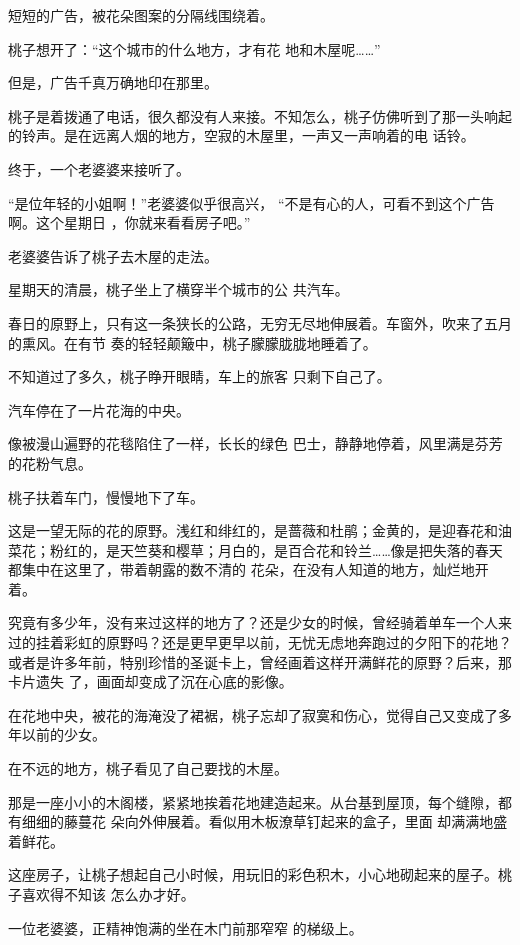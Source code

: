 \documentclass{article}
\begin{document}
短短的广告，被花朵图案的分隔线围绕着。 

桃子想开了：“这个城市的什么地方，才有花
地和木屋呢……” 


但是，广告千真万确地印在那里。 

桃子是着拨通了电话，很久都没有人来接。不知怎么，桃子仿佛听到了那一头响起的铃声。是在远离人烟的地方，空寂的木屋里，一声又一声响着的电
话铃。 


终于，一个老婆婆来接听了。 

“是位年轻的小姐啊！”老婆婆似乎很高兴，
\newpage
“不是有心的人，可看不到这个广告啊。这个星期日
，你就来看看房子吧。” 


老婆婆告诉了桃子去木屋的走法。 

星期天的清晨，桃子坐上了横穿半个城市的公
共汽车。 

春日的原野上，只有这一条狭长的公路，无穷无尽地伸展着。车窗外，吹来了五月的熏风。在有节
奏的轻轻颠簸中，桃子朦朦胧胧地睡着了。 

不知道过了多久，桃子睁开眼睛，车上的旅客
只剩下自己了。 


汽车停在了一片花海的中央。 

像被漫山遍野的花毯陷住了一样，长长的绿色
巴士，静静地停着，风里满是芬芳的花粉气息。 


\newpage

桃子扶着车门，慢慢地下了车。 

这是一望无际的花的原野。浅红和绯红的，是蔷薇和杜鹃；金黄的，是迎春花和油菜花；粉红的，是天竺葵和樱草；月白的，是百合花和铃兰……像是把失落的春天都集中在这里了，带着朝露的数不清的
花朵，在没有人知道的地方，灿烂地开着。 

究竟有多少年，没有来过这样的地方了？还是少女的时候，曾经骑着单车一个人来过的挂着彩虹的原野吗？还是更早更早以前，无忧无虑地奔跑过的夕阳下的花地？或者是许多年前，特别珍惜的圣诞卡上，曾经画着这样开满鲜花的原野？后来，那卡片遗失
了，画面却变成了沉在心底的影像。 

在花地中央，被花的海淹没了裙裾，桃子忘却了寂寞和伤心，觉得自己又变成了多年以前的少女。

在不远的地方，桃子看见了自己要找的木屋。

那是一座小小的木阁楼，紧紧地挨着花地建造起来。从台基到屋顶，每个缝隙，都有细细的藤蔓花
\newpage
朵向外伸展着。看似用木板潦草钉起来的盒子，里面
却满满地盛着鲜花。 

这座房子，让桃子想起自己小时候，用玩旧的彩色积木，小心地砌起来的屋子。桃子喜欢得不知该
怎么办才好。 

一位老婆婆，正精神饱满的坐在木门前那窄窄
的梯级上。 
\end{document}
